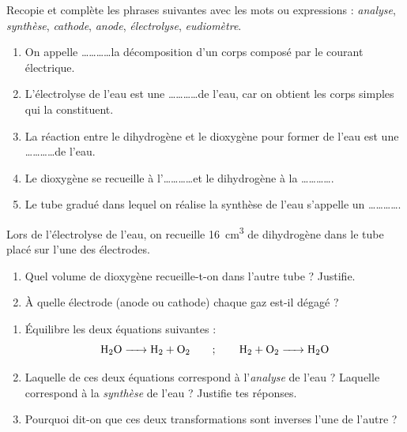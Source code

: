 \documentclass[11pt]{article}
\newcounter{popsec}
\newcounter{popsub}
\newcommand{\courssub}[1]{%
  \stepcounter{popsub}%
  \par\vspace{9pt}\noindent{\popxbold\fontsize{11.5}{13}\selectfont\color{popink}{\color{poporange}\thepopsec.\thepopsub}\hspace{6pt}#1}\par\nopagebreak\vspace{4pt}
}
\begin{document}
\begin{exercice}
Recopie et complète les phrases suivantes avec les mots ou expressions : \emph{analyse}, \emph{synthèse}, \emph{cathode}, \emph{anode}, \emph{électrolyse}, \emph{eudiomètre}.
\begin{enumerate}
\item On appelle \ldots\ldots\ldots\ldots la décomposition d'un corps composé par le courant électrique.
\item L'électrolyse de l'eau est une \ldots\ldots\ldots\ldots de l'eau, car on obtient les corps simples qui la constituent.
\item La réaction entre le dihydrogène et le dioxygène pour former de l'eau est une \ldots\ldots\ldots\ldots de l'eau.
\item Le dioxygène se recueille à l'\ldots\ldots\ldots\ldots et le dihydrogène à la \ldots\ldots\ldots\ldots.
\item Le tube gradué dans lequel on réalise la synthèse de l'eau s'appelle un \ldots\ldots\ldots\ldots.
\end{enumerate}
\end{exercice}

\begin{exercice}
Lors de l'électrolyse de l'eau, on recueille \SI{16}{cm^3} de dihydrogène dans le tube placé sur l'une des électrodes.
\begin{enumerate}
\item Quel volume de dioxygène recueille-t-on dans l'autre tube ? Justifie.
\item À quelle électrode (anode ou cathode) chaque gaz est-il dégagé ?
\end{enumerate}
\end{exercice}

\courssub{Je m'entraîne}

\begin{exercice}
\begin{enumerate}
\item Équilibre les deux équations suivantes :
\[\ce{H2O -> H2 + O2} \qquad ; \qquad \ce{H2 + O2 -> H2O}\]
\item Laquelle de ces deux équations correspond à l'\emph{analyse} de l'eau ? Laquelle correspond à la \emph{synthèse} de l'eau ? Justifie tes réponses.
\item Pourquoi dit-on que ces deux transformations sont inverses l'une de l'autre ?
\end{enumerate}
\end{exercice}
\end{document}
